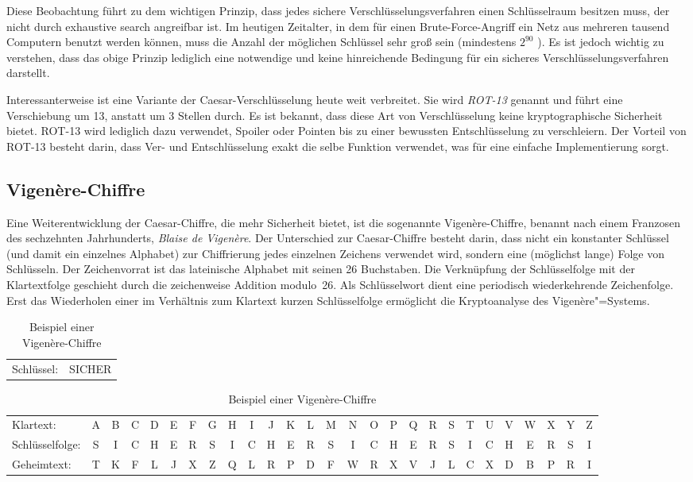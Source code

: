 Diese Beobachtung führt zu dem wichtigen Prinzip, dass jedes sichere Verschlüsselungsverfahren einen Schlüsselraum besitzen muss, der nicht durch exhaustive search angreifbar ist. Im heutigen Zeitalter, in dem für einen Brute-Force-Angriff ein Netz aus mehreren tausend Computern benutzt werden können, muss die Anzahl der möglichen Schlüssel sehr groß sein (mindestens $2^{90}$ \cite{Blaze1996}). Es ist jedoch wichtig zu verstehen, dass das obige Prinzip lediglich eine notwendige und keine hinreichende Bedingung für ein sicheres Verschlüsselungsverfahren darstellt.

Interessanterweise ist eine Variante der Caesar-Verschlüsselung heute weit verbreitet. Sie wird \emph{ROT-13} genannt und führt eine Verschiebung
um 13, anstatt um 3 Stellen durch. Es ist bekannt, dass diese Art von Verschlüsselung keine kryptographische Sicherheit bietet. ROT-13 wird lediglich dazu
verwendet, Spoiler oder Pointen bis zu einer bewussten Entschlüsselung zu verschleiern. Der Vorteil von ROT-13 besteht darin, dass Ver- und
Entschlüsselung exakt die selbe Funktion verwendet, was für eine einfache Implementierung sorgt.

\subsection{Vigen\`ere-Chiffre}
\label{ssec:vigenere}
Eine Weiterentwicklung der Caesar-Chiffre, die mehr Sicherheit bietet, ist die sogenannte Vigen\`ere-Chiffre, benannt nach einem Franzosen des
sechzehnten Jahrhunderts, \emph{Blaise de Vigen\`ere}. Der Unterschied zur Caesar-Chiffre besteht darin, dass nicht ein konstanter Schlüssel (und damit ein
einzelnes Alphabet) zur Chiffrierung jedes einzelnen Zeichens verwendet wird, sondern eine (möglichst lange) Folge von Schlüsseln. Der Zeichenvorrat ist das
lateinische Alphabet mit seinen 26 Buchstaben. Die Verknüpfung der Schlüsselfolge mit der Klartextfolge geschieht durch die zeichenweise Addition modulo~26.
Als Schlüsselwort dient eine periodisch wiederkehrende Zeichenfolge. Erst das Wiederholen einer im Verhältnis zum Klartext kurzen Schlüsselfolge
ermöglicht die Kryptoanalyse des Vigen\`ere"=Systems.

\begin{table}[h]
	\centering
	\setlength{\tabcolsep}{2pt}
	\begin{tabular}{ll}
		Schlüssel: 
		& SICHER
	\end{tabular}
	\begin{tabular}{l*{26}{c}}
		Klartext:
		&A&B&C&D&E&F&G&H&I&J&K&L&M&N&O&P&Q&R&S&T&U&V&W&X&Y&Z\\
		Schlüsselfolge:
		&S&I&C&H&E&R&S&I&C&H&E&R&S&I&C&H&E&R&S&I&C&H&E&R&S&I\\
		Geheimtext:
		&T&K&F&L&J&X&Z&Q&L&R&P&D&F&W&R&X&V&J&L&C&X&D&B&P&R&I\\
	\end{tabular}
	\caption{Beispiel einer Vigen\`ere-Chiffre}
\end{table}
\clearpage

